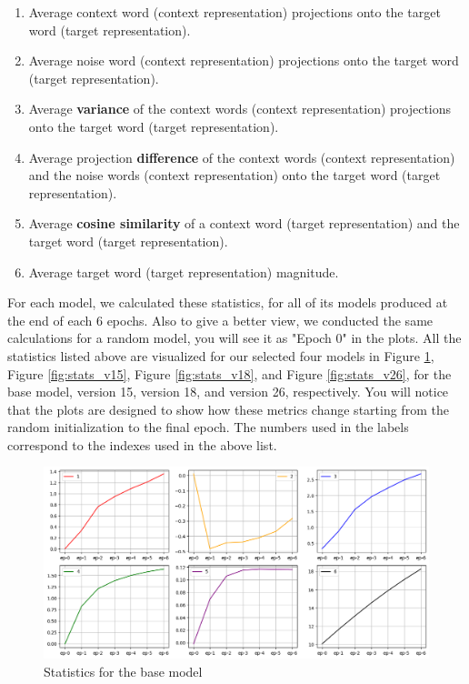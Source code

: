 \begin{enumerate}
    \item Average context word (context representation) projections onto the target word (target representation).
    \item Average noise word (context representation) projections onto the target word (target representation).
    \item Average \textbf{variance} of the context words (context representation) projections onto the target word (target representation).
    \item Average projection \textbf{difference} of the context words (context representation) and the noise words (context representation) onto the target word (target representation).
    \item Average \textbf{cosine similarity} of a context word (target representation) and the target word (target representation).
    \item Average target word (target representation) magnitude.
\end{enumerate}

For each model, we calculated these statistics, for all of its models produced at the end of each 6 epochs. Also to give a better view, we conducted the same calculations for a random model, you will see it as "Epoch 0" in the plots. All the statistics listed above are visualized for our selected four models in Figure \ref{fig:stats_base}, Figure \ref{fig:stats_v15}, Figure \ref{fig:stats_v18}, and Figure \ref{fig:stats_v26}, for the base model, version 15, version 18, and version 26, respectively. You will notice that the plots are designed to show how these metrics change starting from the random initialization to the final epoch. The numbers used in the labels correspond to the indexes used in the above list. 

\begin{figure}[!ht]
    \centering
    \includegraphics[width=1.0\textwidth]{img/stats_base.png}
    \caption{Statistics for the base model}
    \label{fig:stats_base}
\end{figure}

